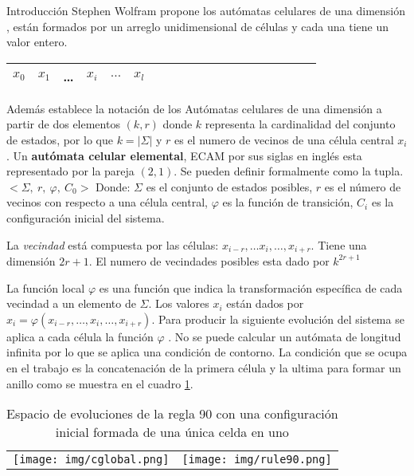 \documentclass{article}
\begin{document}
\begin{section}{Introducción}
        \noindent Stephen Wolfram propone los autómatas celulares de una dimensión \cite{stephenW1982}\cite{stephenW1985} , están formados por un arreglo unidimensional de células y cada una tiene un valor entero.
        \begin{table}[H]
        \centering
        \begin{tabular}{|l|l|l|l|l|l|l|l|l|l|l|l|l|l|l|l|l|l|l|}
        \hline
        $x_{0}$&$x_{1}$&\dots& $x_{i}$ &$\ldots$  & $x_{l}$  \\ \hline
        \end{tabular}
        \end{table}
        \noindent Además establece la notación de los Autómatas celulares de una dimensión a partir de dos elementos $\left( k, r\right)$
        donde $k$ representa la cardinalidad del conjunto de estados, por lo que $k = |\Sigma|$ y $r$ es el numero de vecinos de una célula central $x_{i}$ . 
        \noindent
        Un \textbf{autómata celular elemental}, ECAM por sus siglas en inglés esta representado por la pareja $(2,1)$.
        Se pueden definir formalmente como la tupla. $ <\Sigma,\ r ,\ \varphi,\ C_{0} > $ Donde: $ \Sigma $ es el conjunto de estados posibles, $ r $ es el número de vecinos con respecto a una célula central,  $ \varphi $ es la función de transición, $ C_{i} $ es la configuración inicial del sistema.
        
        \noindent La \textit{vecindad} está compuesta por las células:  $x_{i-r}, \dots x_{i} , \dots, x_{i+r} $. Tiene una dimensión $2r + 1$. El numero de vecindades posibles esta dado por $k^{2r+1}$  

        \noindent La función local $\varphi$ es una función que indica la transformación específica de cada vecindad a un elemento de $\Sigma$.  
        Los valores $x_{i}$ están dados por $x_{i}= \varphi \left( x_{i-r}, \dots, x_{i}, \dots, x_{i+r} \right)$. Para producir la siguiente evolución del sistema se aplica a cada célula la función $\varphi$ \cite{genaroDoc}. No se puede calcular un autómata de longitud infinita por lo que se aplica una condición de contorno. La condición que se ocupa en el trabajo es la concatenación de la primera célula y la ultima para formar un anillo como se muestra en el cuadro  \ref{espacioEvoluciones}.

        \begin{table}[H]
        \centering
        \label{espacioEvoluciones}
        
        \begin{tabular}{ll}
        \texttt{[image: img/cglobal.png]}
         &
        \texttt{[image: img/rule90.png]}
        \end{tabular}
        \caption{Espacio de evoluciones de la regla 90 con una configuración inicial formada de una única celda en uno \cite{genaroMaes}}
        \end{table}
        

\end{section}
\end{document}
